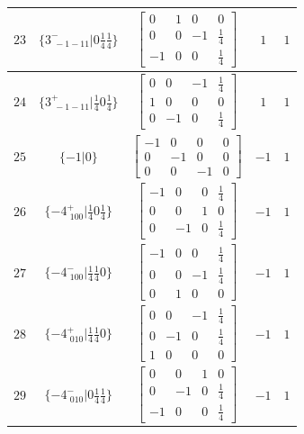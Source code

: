 \documentclass[fleqn,8pt]{jsarticle}
\begin{document}
\begin{longtable}{ccccc}
$ 23 $ & $ \{3^{-}_{\,\,-1-11}|0 \frac{1}{4} \frac{1}{4}\} $ & $ \begin{bmatrix} 0 & 1 & 0 & 0 \\ 0 & 0 & -1 & \frac{1}{4} \\ -1 & 0 & 0 & \frac{1}{4} \end{bmatrix} $ & $ 1 $ & $ 1 $ \\ \hline
$ 24 $ & $ \{3^{+}_{\,\,-1-11}|\frac{1}{4} 0 \frac{1}{4}\} $ & $ \begin{bmatrix} 0 & 0 & -1 & \frac{1}{4} \\ 1 & 0 & 0 & 0 \\ 0 & -1 & 0 & \frac{1}{4} \end{bmatrix} $ & $ 1 $ & $ 1 $ \\ \hline
$ 25 $ & $ \{-1|0\} $ & $ \begin{bmatrix} -1 & 0 & 0 & 0 \\ 0 & -1 & 0 & 0 \\ 0 & 0 & -1 & 0 \end{bmatrix} $ & $ -1 $ & $ 1 $ \\ \hline
$ 26 $ & $ \{-4^{+}_{\,\,100}|\frac{1}{4} 0 \frac{1}{4}\} $ & $ \begin{bmatrix} -1 & 0 & 0 & \frac{1}{4} \\ 0 & 0 & 1 & 0 \\ 0 & -1 & 0 & \frac{1}{4} \end{bmatrix} $ & $ -1 $ & $ 1 $ \\ \hline
$ 27 $ & $ \{-4^{-}_{\,\,100}|\frac{1}{4} \frac{1}{4} 0\} $ & $ \begin{bmatrix} -1 & 0 & 0 & \frac{1}{4} \\ 0 & 0 & -1 & \frac{1}{4} \\ 0 & 1 & 0 & 0 \end{bmatrix} $ & $ -1 $ & $ 1 $ \\ \hline
$ 28 $ & $ \{-4^{+}_{\,\,010}|\frac{1}{4} \frac{1}{4} 0\} $ & $ \begin{bmatrix} 0 & 0 & -1 & \frac{1}{4} \\ 0 & -1 & 0 & \frac{1}{4} \\ 1 & 0 & 0 & 0 \end{bmatrix} $ & $ -1 $ & $ 1 $ \\ \hline
$ 29 $ & $ \{-4^{-}_{\,\,010}|0 \frac{1}{4} \frac{1}{4}\} $ & $ \begin{bmatrix} 0 & 0 & 1 & 0 \\ 0 & -1 & 0 & \frac{1}{4} \\ -1 & 0 & 0 & \frac{1}{4} \end{bmatrix} $ & $ -1 $ & $ 1 $ \\ \hline

\end{longtable}
\end{document}
